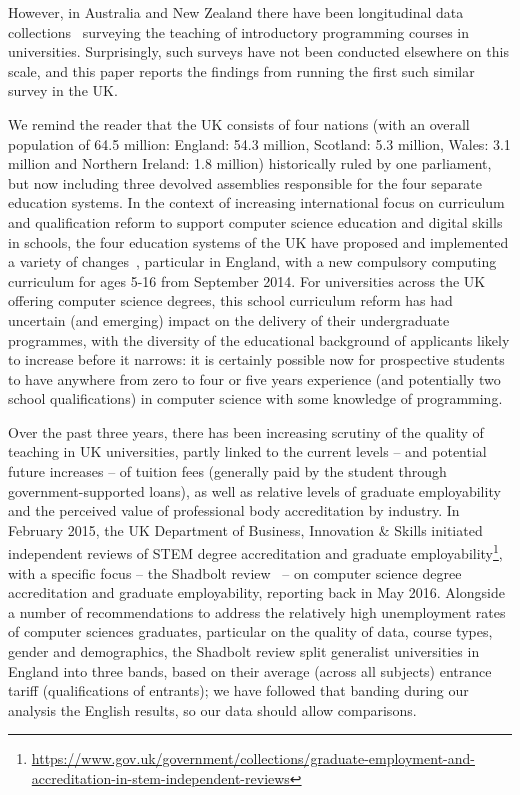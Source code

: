 \documentclass{sig-alternate}
\begin{document}
However, in Australia and New Zealand there have been longitudinal
data
collections~\cite{deraadt-et-al:2004,mason-et-al:2012,mason+cooper:2014}
surveying the teaching of introductory programming courses in
universities. Surprisingly, such surveys have not been conducted
elsewhere on this scale, and this paper reports the findings from
running the first such similar survey in the UK.

We remind the reader that the UK consists of four nations (with an
overall population of 64.5 million: England: 54.3 million, Scotland:
5.3 million, Wales: 3.1 million and Northern Ireland: 1.8 million)
historically ruled by one parliament, but now including three devolved
assemblies responsible for the four separate education systems. In the
context of increasing international focus on curriculum and
qualification reform to support computer science education and digital
skills in schools, the four education systems of the UK have proposed
and implemented a variety of
changes~\cite{rs:2012,brown-et-al-toce2014}, particular in England,
with a new compulsory computing curriculum for ages 5-16 from
September 2014. For universities across the UK offering computer
science degrees, this school curriculum reform has had uncertain (and
emerging) impact on the delivery of their undergraduate programmes,
with the diversity of the educational background of applicants likely
to increase before it narrows: it is certainly possible now for
prospective students to have anywhere from zero to four or five years
experience (and potentially two school qualifications) in computer
science with some knowledge of programming.


Over the past three years, there has been increasing scrutiny of the
quality of teaching in UK universities, partly linked to the current
levels -- and potential future increases -- of tuition fees (generally
paid by the student through government-supported loans), as well as
relative levels of graduate employability and the perceived value of
professional body accreditation by industry. In February 2015, the UK
Department of Business, Innovation \& Skills initiated independent
reviews of STEM degree accreditation and graduate
employability\footnote{\url{https://www.gov.uk/government/collections/graduate-employment-and-accreditation-in-stem-independent-reviews}},
with a specific focus -- the Shadbolt review~\cite{shadbolt:2016} --
on computer science degree accreditation and graduate employability,
reporting back in May 2016. Alongside a number of recommendations to
address the relatively high unemployment rates of computer sciences
graduates, particular on the quality of data, course types, gender and
demographics, the Shadbolt review split generalist universities in
England into three bands, based on their average (across all subjects)
entrance tariff (qualifications of entrants); we have followed that
banding during our analysis the English results, so our data should
allow comparisons.
\end{document}
